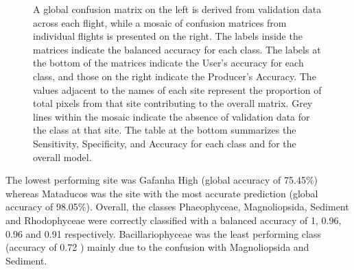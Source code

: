\documentclass[
  number]{elsarticle}
\begin{document}
\label{cell-fig-Validation}
\begin{figure}[H]


\caption{\label{fig-Validation}A global confusion matrix on the left is
derived from validation data across each flight, while a mosaic of
confusion matrices from individual flights is presented on the right.
The labels inside the matrices indicate the balanced accuracy for each
class. The labels at the bottom of the matrices indicate the User's
accuracy for each class, and those on the right indicate the Producer's
Accuracy. The values adjacent to the names of each site represent the
proportion of total pixels from that site contributing to the overall
matrix. Grey lines within the mosaic indicate the absence of validation
data for the class at that site. The table at the bottom summarizes the
Sensitivity, Specificity, and Accuracy for each class and for the
overall model.}

\end{figure}%

The lowest performing site was Gafanha High (global accuracy of 75.45\%)
whereas Mataducos was the site with the most accurate prediction (global
accuracy of 98.05\%). Overall, the classes Phaeophyceae, Magnoliopsida,
Sediment and Rhodophyceae were correctly classified with a balanced
accuracy of 1, 0.96, 0.96 and 0.91 respectively. Bacillariophyceae was
the least performing class (accuracy of 0.72 ) mainly due to the
confusion with Magnoliopsida and Sediment.
\end{document}

